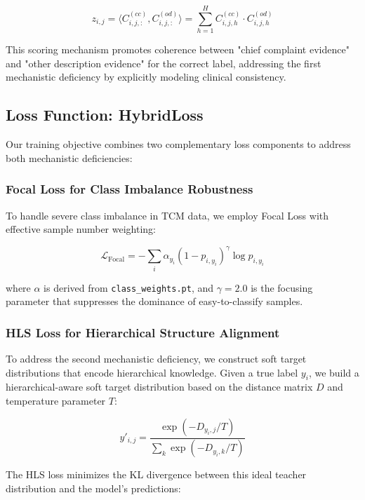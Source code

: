 \documentclass{article}
\begin{document}
\begin{equation}
z_{i,j} = \langle C^{(cc)}_{i,j,:}, C^{(od)}_{i,j,:} \rangle = \sum_{h=1}^{H} C^{(cc)}_{i,j,h} \cdot C^{(od)}_{i,j,h}
\end{equation}

This scoring mechanism promotes coherence between "chief complaint evidence" and "other description evidence" for the correct label, addressing the first mechanistic deficiency by explicitly modeling clinical consistency.

\subsection{Loss Function: HybridLoss}

Our training objective combines two complementary loss components to address both mechanistic deficiencies:

\subsubsection{Focal Loss for Class Imbalance Robustness}

To handle severe class imbalance in TCM data, we employ Focal Loss with effective sample number weighting:

\begin{equation}
\mathcal{L}_{\text{Focal}} = -\sum_{i} \alpha_{y_i} (1-p_{i,y_i})^\gamma \log p_{i,y_i}
\end{equation}

where $\alpha$ is derived from \texttt{class\_weights.pt}, and $\gamma = 2.0$ is the focusing parameter that suppresses the dominance of easy-to-classify samples.

\subsubsection{HLS Loss for Hierarchical Structure Alignment}

To address the second mechanistic deficiency, we construct soft target distributions that encode hierarchical knowledge. Given a true label $y_i$, we build a hierarchical-aware soft target distribution based on the distance matrix $D$ and temperature parameter $T$:

\begin{equation}
y'_{i,j} = \frac{\exp(-D_{y_i,j}/T)}{\sum_k \exp(-D_{y_i,k}/T)}
\end{equation}

The HLS loss minimizes the KL divergence between this ideal teacher distribution and the model's predictions:
\end{document}
